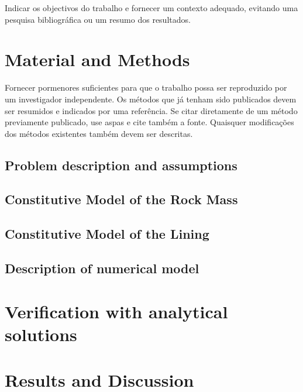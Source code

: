 \documentclass[a4paper,fleqn]{cas-sc}
\begin{document}


Indicar os objectivos do trabalho e fornecer um contexto adequado, evitando uma pesquisa bibliográfica
ou um resumo dos resultados.

\section{Material and Methods}\label{}

Fornecer pormenores suficientes para que o trabalho possa ser reproduzido por um investigador independente. Os métodos que já tenham sido publicados devem ser resumidos e indicados por uma referência. Se citar diretamente de um método previamente publicado, use aspas e cite também a fonte. Quaisquer modificações dos métodos existentes também devem ser descritas. 

\subsection{Problem description and assumptions}\label{}



\subsection{Constitutive Model of the Rock Mass}\label{}


\subsection{Constitutive Model of the Lining}\label{}

\subsection{Description of numerical model}\label{}

\section{Verification with analytical solutions}\label{}

\section{Results and Discussion}\label{}
\end{document}
